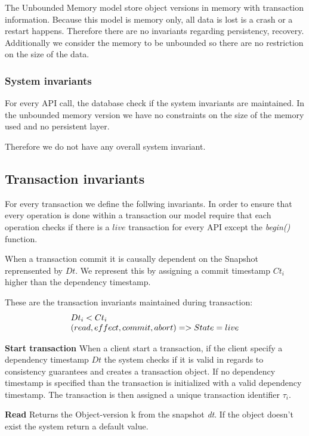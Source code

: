 \documentclass[parallelisme]{compas2022}
\begin{document}
The Unbounded Memory model store object versions in memory with transaction information.
Because this model is memory only, all data is lost is a crash or a restart happens.
Therefore there are no invariants regarding persistency, recovery.
Additionally we consider the memory to be unbounded so there are no restriction on the size of the data. 


\subsubsection{System invariants}

For every API call, the database check if the system invariants are maintained.
In the unbounded memory version we have no constraints on the size of the memory used and no persistent layer.

Therefore we do not have any overall system invariant.

\subsection{Transaction invariants}


For every transaction we define the follwing invariants.
In order to ensure that every operation is done within a transaction our model require that each operation checks if there is a $live$ transaction for every API except the \emph{begin()} function.

When a transaction commit it is causally dependent on the Snapshot reprensented by $Dt$.
We represent this by assigning a commit timestamp $Ct_i$ higher than the dependency timestamp.

These are the transaction invariants maintained during transaction:
\[
  \begin{array}{lcl}
    \emph{$Dt_i < Ct_i$}\\
    \emph{$(read, effect, commit, abort) => State = live$}
  \end{array} 
\]


\textbf{Start transaction}
When a client start a transaction, if the client specify a dependency timestamp $Dt$ the system checks if it is valid in regards to consistency guarantees and creates a transaction object.
If no dependency timestamp is specified than the transaction is initialized with a valid dependency timestamp.
The transaction is then assigned a unique transaction identifier $\tau_i$.


\textbf{Read}
Returns the Object-version k from the snapshot \emph{dt}. 
If the object doesn't exist the system return a default value.
\end{document}
